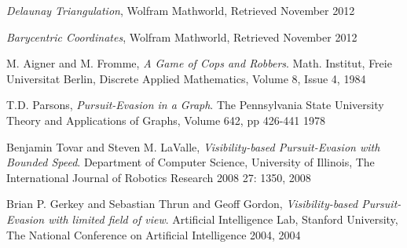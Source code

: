 \documentclass{article}
\begin{document}
\begin{thebibliography}{9}

  \emph{Delaunay Triangulation},
  Wolfram Mathworld,
  Retrieved November 2012
  
  \emph{Barycentric Coordinates},
  Wolfram Mathworld,
  Retrieved November 2012

  M. Aigner and M. Fromme,
  \emph{A Game of Cops and Robbers}.
  Math. Institut, Freie Universitat Berlin,
  Discrete Applied Mathematics, Volume 8, Issue 4,
  1984
  
  T.D. Parsons,
  \emph{Pursuit-Evasion in a Graph}.
  The Pennsylvania State University
  Theory and Applications of Graphs, Volume 642, pp 426-441
  1978
  
  Benjamin Tovar and Steven M. LaValle,
  \emph{Visibility-based Pursuit-Evasion with Bounded Speed}.
  Department of Computer Science, University of Illinois,
  The International Journal of Robotics Research 2008 27: 1350,
  2008
  
  Brian P. Gerkey and Sebastian Thrun and Geoff Gordon,
  \emph{Visibility-based Pursuit-Evasion with limited field of view}.
  Artificial Intelligence Lab, Stanford University,
  The National Conference on Artificial Intelligence 2004,
  2004

\end{thebibliography}
\end{document}
